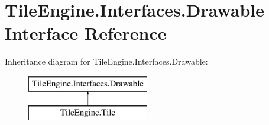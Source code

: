 \hypertarget{interface_tile_engine_1_1_interfaces_1_1_drawable}{\section{Tile\-Engine.\-Interfaces.\-Drawable Interface Reference}
\label{interface_tile_engine_1_1_interfaces_1_1_drawable}
}
Inheritance diagram for Tile\-Engine.\-Interfaces.\-Drawable\-:\begin{figure}[H]
\begin{center}
\leavevmode
\includegraphics[height=2.000000cm]{interface_tile_engine_1_1_interfaces_1_1_drawable}
\end{center}
\end{figure}
